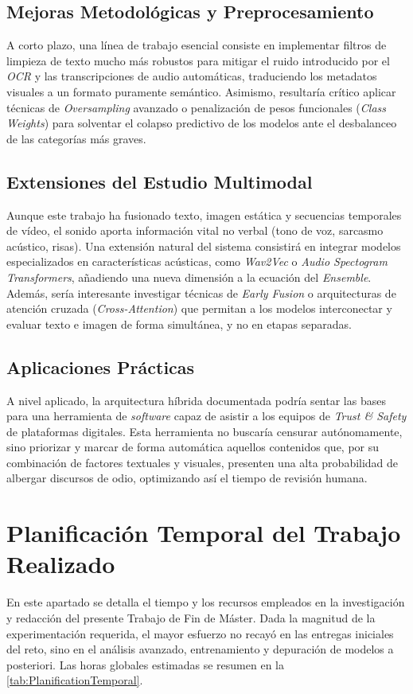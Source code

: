 \subsection*{Mejoras Metodológicas y Preprocesamiento}
A corto plazo, una línea de trabajo esencial consiste en implementar filtros de limpieza de texto mucho más robustos para mitigar el ruido introducido por el \textit{OCR} y las transcripciones de audio automáticas, traduciendo los metadatos visuales a un formato puramente semántico. Asimismo, resultaría crítico aplicar técnicas de \textit{Oversampling} avanzado o penalización de pesos funcionales (\textit{Class Weights}) para solventar el colapso predictivo de los modelos ante el desbalanceo de las categorías más graves.

\subsection*{Extensiones del Estudio Multimodal}
Aunque este trabajo ha fusionado texto, imagen estática y secuencias temporales de vídeo, el sonido aporta información vital no verbal (tono de voz, sarcasmo acústico, risas). Una extensión natural del sistema consistirá en integrar modelos especializados en características acústicas, como \textit{Wav2Vec} o \textit{Audio Spectogram Transformers}, añadiendo una nueva dimensión a la ecuación del \textit{Ensemble}. Además, sería interesante investigar técnicas de \textit{Early Fusion} o arquitecturas de atención cruzada (\textit{Cross-Attention}) que permitan a los modelos interconectar y evaluar texto e imagen de forma simultánea, y no en etapas separadas.


\subsection*{Aplicaciones Prácticas}
A nivel aplicado, la arquitectura híbrida documentada podría sentar las bases para una herramienta de \textit{software} capaz de asistir a los equipos de \textit{Trust \& Safety} de plataformas digitales. Esta herramienta no buscaría censurar autónomamente, sino priorizar y marcar de forma automática aquellos contenidos que, por su combinación de factores textuales y visuales, presenten una alta probabilidad de albergar discursos de odio, optimizando así el tiempo de revisión humana.

\section{Planificación Temporal del Trabajo Realizado}
En este apartado se detalla el tiempo y los recursos empleados en la investigación y redacción del presente Trabajo de Fin de Máster. Dada la magnitud de la experimentación requerida, el mayor esfuerzo no recayó en las entregas iniciales del reto, sino en el análisis avanzado, entrenamiento y depuración de modelos a posteriori. Las horas globales estimadas se resumen en la \autoref{tab:PlanificationTemporal}.


